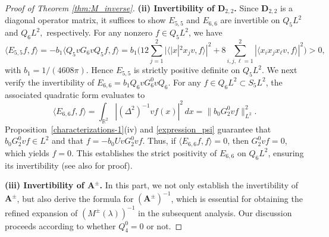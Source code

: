 \documentclass[reqno]{amsart}
\numberwithin{equation}{section}
\begin{document}
\begin{proof}[Proof of Theorem \ref{thm:M_inverse}]
\textbf{(ii) Invertibility of $\mathbf{D}_{2,2}$.} Since $\mathbf{D}_{2,2}$ is a diagonal operator matrix, it suffices to show  $E_{5,5}$ and $E_{6,6}$ are invertible on $Q_5 L^2$ and $Q_6 L^2,$ respectively.
	 For any nonzero $f \in Q_5 L^2$, we have
	\[
	\langle E_{5,5}f, f \rangle = -b_1 \langle Q_5 v G_6 v Q_5 f, f \rangle
	= b_1 \Big( 12 \sum_{j=1}^{2} |\langle |x|^2 x_j v, f \rangle|^2 + 8 \sum_{i,j,\ell=1}^{2} |\langle x_i x_j x_\ell v, f \rangle|^2 \Big)>0,
	\]
	with $ b_1 = {1}/({4608\pi}).$ Hence $ E_{5,5}$ is strictly positive definite on $Q_5L^2$.
	We next verify the invertibility of $E_{6,6} = b_1 Q_6 v G_6^0 v Q_6$. For any $f \in Q_6 L^2 \subset S_5 L^2$, the associated quadratic form evaluates to
	\[
	\langle E_{6,6} f, f \rangle = \int_{\mathbb{R}^2} |(\Delta^2)^{-1} v f(x)|^2 \, dx = \|b_0 G_2^0 v f\|_{L^2}^2.
	\]
	Proposition~\ref{characterizations-1}(iv) and \eqref{expression_psi} guarantee that $b_0 G_2^0 v f \in L^2$ and that $f =-b_0 U v G_2^0 v f$. Thus, if $\langle E_{6,6} f, f \rangle = 0$, then $G_2^0 v f = 0$, which yields $f = 0$. This establishes the strict positivity of $E_{6,6}$ on $Q_6 L^2$, ensuring its invertibility (see also \cite[Lemma 4.9]{LSY21} for proof).
		
	\textbf{(iii) Invertibility of $\mathbf{A}^{\pm}$.} In this part, we not only establish the invertibility of $\mathbf{A}^{\pm}$, but also derive the formula for  $(\mathbf{A}^{\pm})^{-1}$, which is essential for obtaining the refined expansion of $(M^{\pm}(\lambda))^{-1}$ in the subsequent analysis.  
Our discussion proceeds according to whether $Q_4^0 = 0$ or not.
	

\end{proof}
\end{document}
